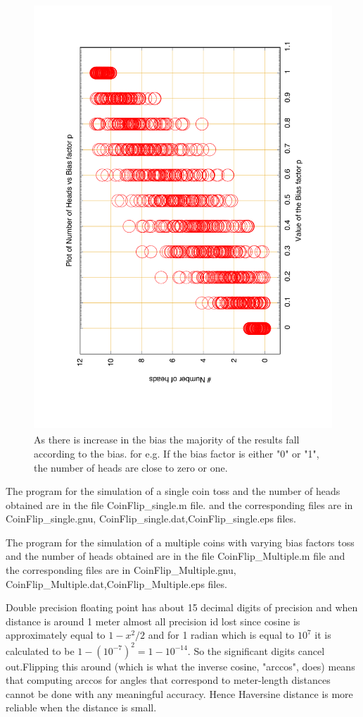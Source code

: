 \documentclass[fleqn,letterpaper,12pt]{report}
\begin{document}
\begin{figure}[ht!]
	\centering
	\includegraphics[height=160mm,width=120mm,angle=-90]{CoinFlip_Multiple.pdf}\caption{As there is increase in the bias the majority of the results fall according to the bias. for e.g. If the bias factor is either "0" or "1", the number of heads are close to zero or one. 
 \label{overflow}}
\end{figure} 
The program for the simulation of a single coin toss and the number of heads obtained are in the file {\color{blue} CoinFlip\_single.m} file. and the corresponding files are in {\color{blue} CoinFlip\_single.gnu, CoinFlip\_single.dat,CoinFlip\_single.eps} files.

The program for the simulation of a multiple coins with varying bias factors toss and the number of heads obtained are in the file {\color{blue} CoinFlip\_Multiple.m} file and the corresponding files are in {\color{blue} CoinFlip\_Multiple.gnu, CoinFlip\_Multiple.dat,CoinFlip\_Multiple.eps} files.
\vfill
%
\newpage
\clearpage
{}
{}
\problem
Double precision floating point has about 15 decimal digits of precision and when distance is around 1 meter almost all precision id lost since cosine is approximately equal to $1-x^2/2$ and for 1 radian which is equal to $10^7$ it is calculated to be $1-(10^{-7})^2 = 1-10^{-14}$. So the significant digits cancel out.Flipping this around (which is what the inverse cosine, "arccos", does) means that computing arccos for angles that correspond to meter-length distances cannot be done with any meaningful accuracy. Hence Haversine distance is more reliable when the distance is small. \cite{Dist}
\end{document}
